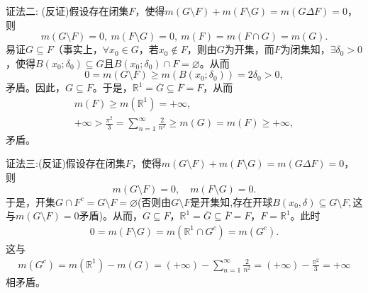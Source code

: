 \documentclass[../../main.tex]{subfiles}%
\begin{document}
\begin{solution}
\begin{enumerate}[(1)]
{\color{blue}证法二:} (反证)假设存在闭集$F$，使得$m(G\setminus F)+m(F\setminus G)=m(G\Delta F)=0$，则
\[
m(G\setminus F)=0,\ m(F\setminus G)=0,\ m(F)=m(F\cap G)=m(G).
\]
易证$G\subseteq F$（事实上，$\forall x_0\in G$，若$x_0\notin F$，则由$G$为开集，而$F$为闭集知，$\exists\delta_0>0$，使得$B(x_0;\delta_0)\subseteq G$且$B(x_0;\delta_0)\cap F=\varnothing$。从而
\[
0 = m(G\setminus F)\geqslant m(B(x_0;\delta_0))=2\delta_0>0,
\]
矛盾。因此，$G\subseteq F$。于是，$\mathbb{R}^1=\overline{G}\subseteq\overline{F}=F$，从而
\begin{gather*}
m(F)\geqslant m(\mathbb{R}^1)=+\infty, \\
+\infty>\frac{\pi^2}{3}=\sum_{n=1}^{\infty}{\frac{2}{n^2}}\geqslant m(G)=m(F)\geqslant+\infty,
\end{gather*}
矛盾。

{\color{blue}证法三:}(反证)假设存在闭集$F$，使得$m(G\setminus F)+m(F\setminus G)=m(G\Delta F)=0$，则
\[
m(G\setminus F)=0,\quad m(F\setminus G)=0.
\]
于是，开集$G\cap F^c=G\setminus F=\varnothing$(否则由$G\setminus F$是开集知,存在开球$B(x_0,\delta)\subseteq G\setminus F,$这与$m(G\setminus F)=0$矛盾)。从而，$G\subseteq F$，$\mathbb{R}^1=\overline{G}\subseteq\overline{F}=F$，$F=\mathbb{R}^1$。此时
\begin{align*}
0 = m(F\setminus G)=m(\mathbb{R}^1\cap G^c)=m(G^c).
\end{align*}
这与
\begin{align*}
m(G^c)=m(\mathbb{R}^1)-m(G)=(+\infty)-\sum\limits_{n=1}^{\infty}\frac{2}{n^2}=(+\infty)-\frac{\pi^2}{3}=+\infty
\end{align*}
相矛盾。
\end{enumerate}

\end{solution}
\end{document}
